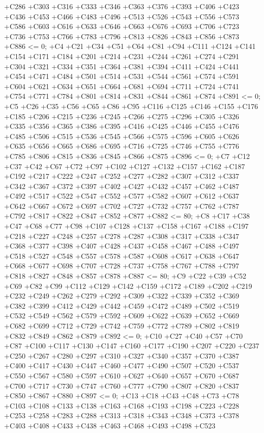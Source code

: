  +C286 +C303 +C316 +C333 +C346 +C363 +C376 +C393 +C406 +C423 +C436 +C453 +C466 +C483 +C496 +C513 +C526
 +C543 +C556 +C573 +C586 +C603 +C616 +C633 +C646 +C663 +C676 +C693 +C706 +C723 +C736 +C753 +C766 +C783
 +C796 +C813 +C826 +C843 +C856 +C873 +C886 <= 0;
+C4 +C21 +C34 +C51 +C64 +C81 +C94 +C111 +C124 +C141 +C154 +C171 +C184 +C201 +C214 +C231 +C244 +C261 +C274
 +C291 +C304 +C321 +C334 +C351 +C364 +C381 +C394 +C411 +C424 +C441 +C454 +C471 +C484 +C501 +C514 +C531
 +C544 +C561 +C574 +C591 +C604 +C621 +C634 +C651 +C664 +C681 +C694 +C711 +C724 +C741 +C754 +C771 +C784
 +C801 +C814 +C831 +C844 +C861 +C874 +C891 <= 0;
+C5 +C26 +C35 +C56 +C65 +C86 +C95 +C116 +C125 +C146 +C155 +C176 +C185 +C206 +C215 +C236 +C245 +C266 +C275
 +C296 +C305 +C326 +C335 +C356 +C365 +C386 +C395 +C416 +C425 +C446 +C455 +C476 +C485 +C506 +C515 +C536
 +C545 +C566 +C575 +C596 +C605 +C626 +C635 +C656 +C665 +C686 +C695 +C716 +C725 +C746 +C755 +C776 +C785
 +C806 +C815 +C836 +C845 +C866 +C875 +C896 <= 0;
+C7 +C12 +C37 +C42 +C67 +C72 +C97 +C102 +C127 +C132 +C157 +C162 +C187 +C192 +C217 +C222 +C247 +C252 +C277
 +C282 +C307 +C312 +C337 +C342 +C367 +C372 +C397 +C402 +C427 +C432 +C457 +C462 +C487 +C492 +C517 +C522
 +C547 +C552 +C577 +C582 +C607 +C612 +C637 +C642 +C667 +C672 +C697 +C702 +C727 +C732 +C757 +C762 +C787
 +C792 +C817 +C822 +C847 +C852 +C877 +C882 <= 80;
+C8 +C17 +C38 +C47 +C68 +C77 +C98 +C107 +C128 +C137 +C158 +C167 +C188 +C197 +C218 +C227 +C248 +C257 +C278
 +C287 +C308 +C317 +C338 +C347 +C368 +C377 +C398 +C407 +C428 +C437 +C458 +C467 +C488 +C497 +C518 +C527
 +C548 +C557 +C578 +C587 +C608 +C617 +C638 +C647 +C668 +C677 +C698 +C707 +C728 +C737 +C758 +C767 +C788
 +C797 +C818 +C827 +C848 +C857 +C878 +C887 <= 80;
+C9 +C22 +C39 +C52 +C69 +C82 +C99 +C112 +C129 +C142 +C159 +C172 +C189 +C202 +C219 +C232 +C249 +C262 +C279
 +C292 +C309 +C322 +C339 +C352 +C369 +C382 +C399 +C412 +C429 +C442 +C459 +C472 +C489 +C502 +C519 +C532
 +C549 +C562 +C579 +C592 +C609 +C622 +C639 +C652 +C669 +C682 +C699 +C712 +C729 +C742 +C759 +C772 +C789
 +C802 +C819 +C832 +C849 +C862 +C879 +C892 <= 0;
+C10 +C27 +C40 +C57 +C70 +C87 +C100 +C117 +C130 +C147 +C160 +C177 +C190 +C207 +C220 +C237 +C250 +C267
 +C280 +C297 +C310 +C327 +C340 +C357 +C370 +C387 +C400 +C417 +C430 +C447 +C460 +C477 +C490 +C507 +C520
 +C537 +C550 +C567 +C580 +C597 +C610 +C627 +C640 +C657 +C670 +C687 +C700 +C717 +C730 +C747 +C760 +C777
 +C790 +C807 +C820 +C837 +C850 +C867 +C880 +C897 <= 0;
+C13 +C18 +C43 +C48 +C73 +C78 +C103 +C108 +C133 +C138 +C163 +C168 +C193 +C198 +C223 +C228 +C253 +C258
 +C283 +C288 +C313 +C318 +C343 +C348 +C373 +C378 +C403 +C408 +C433 +C438 +C463 +C468 +C493 +C498 +C523
